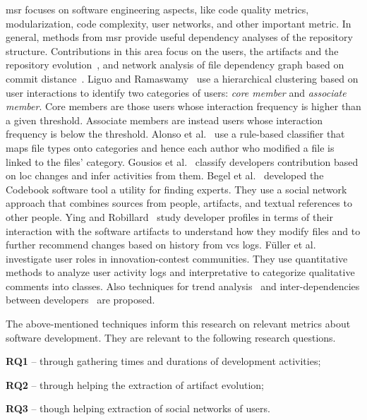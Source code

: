 \documentclass[a4paper,11pt]{article}
\begin{document}
\Gls{msr} focuses on software engineering aspects, like code quality metrics, modularization, code complexity, user networks, and other important metric. In general, methods from \gls{msr} provide useful dependency analyses of the repository structure. Contributions in this area focus on the users, the artifacts and the repository evolution~\cite{Zaidman2008,DAmbros2009}, and network analysis of file dependency graph based on commit distance~\cite{Abate2009,Weicheng2013}. 
 Liguo and Ramaswamy~\cite{Yu.LiguoRamaswamy.2007} use a hierarchical clustering based on user interactions to identify two categories of users: \emph{core member} and \emph{associate member}. Core members are those users whose interaction frequency is higher than a given threshold. Associate members are instead users whose interaction frequency is below the threshold.
Alonso et al.~\cite{Alonso2008} use a rule-based classifier that maps file types onto categories and hence each author who modified a file is linked to the files' category. Gousios et al.~\cite{gousios2008measuring} classify developers contribution based on \gls*{loc} changes and infer activities from them. Begel et al.~\cite{Begel2010} developed the Codebook software tool a utility for finding experts. They use a social network approach that combines sources from people, artifacts, and textual references to other people. 
Ying and Robillard~\cite{Ying2014} study developer profiles in terms of their interaction with the software artifacts to understand how they modify files and to further recommend changes based on history from \gls*{vcs} logs. Füller et al.~\cite{Fuller2014a} investigate user roles in innovation-contest communities. They use quantitative methods to analyze user activity logs and interpretative to categorize qualitative comments into classes. Also techniques for trend analysis~\cite{Ruohonen2015} and inter-dependencies between developers~\cite{Lindberg2016} are proposed. 

The above-mentioned techniques inform this research on relevant metrics about software development. 
They are relevant to the following research questions. 
\begin{inparaenum}[\itshape i)]
	\item \textbf{RQ1} -- through gathering times and durations of development activities;
	\item \textbf{RQ2} -- through helping the extraction of artifact evolution;
	\item \textbf{RQ3} -- though helping extraction of social networks of users.
\end{inparaenum}
\end{document}
